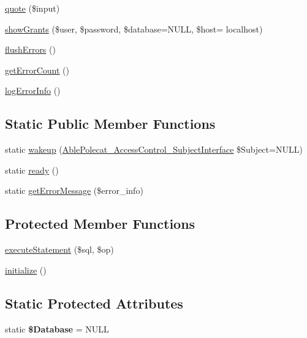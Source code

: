 \begin{DoxyCompactItemize}
\item 
\hyperlink{class_able_polecat___database___pdo_ad6688f4cd3234b8d40f8f92bbcd07e73}{quote} (\$input)
\item 
\hyperlink{class_able_polecat___database___pdo_a5b19ddbce4af265b048ea2ab5e5e1b85}{show\+Grants} (\$user, \$password, \$database=N\+U\+L\+L, \$host= \textquotesingle{}localhost\textquotesingle{})
\item 
\hyperlink{class_able_polecat___database___pdo_a0178cc2ececccefdc65d2c7d1c8fd518}{flush\+Errors} ()
\item 
\hyperlink{class_able_polecat___database___pdo_a20e663e9d39779d1c343740f36c3137a}{get\+Error\+Count} ()
\item 
\hyperlink{class_able_polecat___database___pdo_a3fdddf6c2c95a4b45cf1a8468f07477d}{log\+Error\+Info} ()
\end{DoxyCompactItemize}
\subsection*{Static Public Member Functions}
\begin{DoxyCompactItemize}
\item 
static \hyperlink{class_able_polecat___database___pdo_a3f2135f6ad45f51d075657f6d20db2cd}{wakeup} (\hyperlink{interface_able_polecat___access_control___subject_interface}{Able\+Polecat\+\_\+\+Access\+Control\+\_\+\+Subject\+Interface} \$Subject=N\+U\+L\+L)
\item 
static \hyperlink{class_able_polecat___database___pdo_a4becbc3a94a0b9220b452ccddc1c03ac}{ready} ()
\item 
static \hyperlink{class_able_polecat___database___pdo_a390a90ffac274ffff05475b2702341ed}{get\+Error\+Message} (\$error\+\_\+info)
\end{DoxyCompactItemize}
\subsection*{Protected Member Functions}
\begin{DoxyCompactItemize}
\item 
\hyperlink{class_able_polecat___database___pdo_a1927c7a436d775d3fe5ed7176a500037}{execute\+Statement} (\$sql, \$op)
\item 
\hyperlink{class_able_polecat___database___pdo_a91098fa7d1917ce4833f284bbef12627}{initialize} ()
\end{DoxyCompactItemize}
\subsection*{Static Protected Attributes}
\begin{DoxyCompactItemize}
\item 
\hypertarget{class_able_polecat___database___pdo_ae10cc045c1502f148d1aa728183898e7}{}static {\bfseries \$\+Database} = N\+U\+L\+L\label{class_able_polecat___database___pdo_ae10cc045c1502f148d1aa728183898e7}

\end{DoxyCompactItemize}

